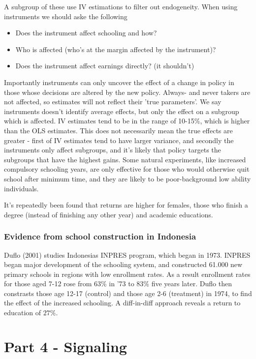 \documentclass[12pt, a4paper]{article}
\begin{document}
\begin{multicols}{2}
A subgroup of these use IV estimations to filter out endogeneity. When using instruments we should aske the following
\begin{itemize}
\item Does the instrument affect schooling and how?
\item Who is affected (who's at the margin affected by the instrument)?
\item Does the instrument affect earnings directly? (it shouldn't)
\end{itemize}
Importantly instruments can only uncover the effect of a change in policy in those whose decisions are altered by the new policy. Always- and never takers are not affected, so estimates will not reflect their 'true parameters'. We say instruments doesn't identify average effects, but only the effect on a subgroup which is affected. IV estimates tend to be in the range of 10-15\%, which is higher than the OLS estimates. This does not necessarily mean the true effects are greater - first of IV estimates tend to have larger variance, and secondly the instruments only affect subgroups, and it's likely that policy targets the subgroups that have the highest gains.
Some natural experiments, like increased compulsory schooling years, are only effective for those who would otherwise quit school after minimum time, and they are likely to be poor-background low ability individuals.

It's repeatedly been found that returns are higher for females, those who finish a degree (instead of finishing any other year) and academic educations.

\subsubsection{Evidence from school construction in Indonesia}
Duflo (2001) studies Indonesias INPRES program, which began in 1973. INPRES began major development of the schooling system, and constructed 61.000 new primary schools in regions with low enrollment rates. As a result enrollment rates for those aged 7-12 rose from 63\% in '73 to 83\% five years later. Duflo then constrasts those age 12-17 (control) and those age 2-6 (treatment) in 1974, to find the effect of the increased schooling. A diff-in-diff approach reveals a return to education of $27\%$.

\section{Part 4 - Signaling}

\end{multicols}
\end{document}
